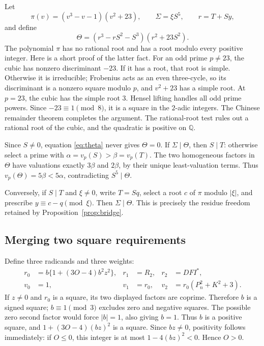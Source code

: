\documentclass[11pt,letterpaper]{article}
\theoremstyle{remark}
\begin{document}
Let
\[
\pi(v)=(v^3-v-1)(v^2+23),\qquad
\Sigma=\xi S^5,\qquad r=T+Sy,
\]
and define
\begin{equation}
\Theta=(r^3-rS^2-S^3)(r^2+23S^2).
\label{eq:theta}
\end{equation}
The polynomial \(\pi\) has no rational root and has a root modulo
every positive integer. Here is a short proof of the latter fact.
For an odd prime \(p\ne23\), the cubic has nonzero discriminant \(-23\).
If it has a root, that root is simple. Otherwise it is irreducible;
Frobenius acts as an even three-cycle, so its discriminant is a
nonzero square modulo \(p\), and \(v^2+23\) has a simple root.
At \(p=23\), the cubic has the simple root \(3\).
Hensel lifting handles all odd prime powers. Since \(-23\equiv1\pmod8\),
it is a square in the \(2\)-adic integers. The Chinese remainder
theorem completes the argument. The rational-root test rules out a
rational root of the cubic, and the quadratic is positive on \(\mathbb Q\).

Since \(S\ne0\), equation \eqref{eq:theta} never gives \(\Theta=0\).
If \(\Sigma\mid\Theta\), then \(S\mid T\): otherwise select a prime with
\(\alpha=v_p(S)>\beta=v_p(T)\). The two homogeneous factors in
\(\Theta\) have valuations exactly \(3\beta\) and \(2\beta\), by their
unique least-valuation terms. Thus \(v_p(\Theta)=5\beta<5\alpha\),
contradicting \(S^5\mid\Theta\).

Conversely, if \(S\mid T\) and \(\xi\ne0\), write \(T=Sq\), select a
root \(c\) of \(\pi\) modulo \(|\xi|\), and prescribe
\(y\equiv c-q\pmod{\xi}\). Then \(\Sigma\mid\Theta\).
This is precisely the residue freedom retained by
Proposition~\ref{prop:bridge}.

\subsection{Merging two square requirements}

Define three radicands and three weights:
\begin{align}
r_0&=b\{1+(3O-4)b^2z^2\},&
r_1&=R_2,&r_2&=DFI^*,\nonumber\\
v_0&=1,&v_1&=r_0,&v_2&=r_0(P_n^2+K^2+3).
\label{eq:radicands}
\end{align}
If \(z\ne0\) and \(r_0\) is a square, its two displayed factors are
coprime. Therefore \(b\) is a signed square; \(b\equiv1\pmod3\)
excludes zero and negative squares. The possible zero second factor
would force \(|b|=1\), also giving \(b=1\).
Thus \(b\) is a positive square, and
\(1+(3O-4)(bz)^2\) is a square. Since \(bz\ne0\), positivity follows
immediately: if \(O\le0\), this integer is at most
\(1-4(bz)^2<0\). Hence \(O>0\).
\end{document}
